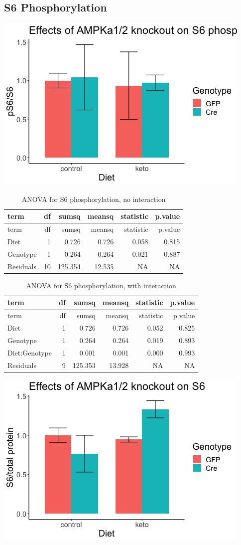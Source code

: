 \documentclass[
]{article}
\begin{document}
\hypertarget{s6-phosphorylation}{%
\subsection{S6 Phosphorylation}\label{s6-phosphorylation}}

\includegraphics{figures/pS6-barplot-1.png}

\begin{longtable}[]{@{}lrrrrr@{}}
\caption{ANOVA for S6 phosphorylation, no interaction}\tabularnewline
\toprule
term & df & sumsq & meansq & statistic & p.value\tabularnewline
\midrule
\endfirsthead
\toprule
term & df & sumsq & meansq & statistic & p.value\tabularnewline
\midrule
\endhead
Diet & 1 & 0.726 & 0.726 & 0.058 & 0.815\tabularnewline
Genotype & 1 & 0.264 & 0.264 & 0.021 & 0.887\tabularnewline
Residuals & 10 & 125.354 & 12.535 & NA & NA\tabularnewline
\bottomrule
\end{longtable}

\begin{longtable}[]{@{}lrrrrr@{}}
\caption{ANOVA for S6 phosphorylation, with interaction}\tabularnewline
\toprule
term & df & sumsq & meansq & statistic & p.value\tabularnewline
\midrule
\endfirsthead
\toprule
term & df & sumsq & meansq & statistic & p.value\tabularnewline
\midrule
\endhead
Diet & 1 & 0.726 & 0.726 & 0.052 & 0.825\tabularnewline
Genotype & 1 & 0.264 & 0.264 & 0.019 & 0.893\tabularnewline
Diet:Genotype & 1 & 0.001 & 0.001 & 0.000 & 0.993\tabularnewline
Residuals & 9 & 125.353 & 13.928 & NA & NA\tabularnewline
\bottomrule
\end{longtable}

\includegraphics{figures/S6-barplot-1.png}
\end{document}
